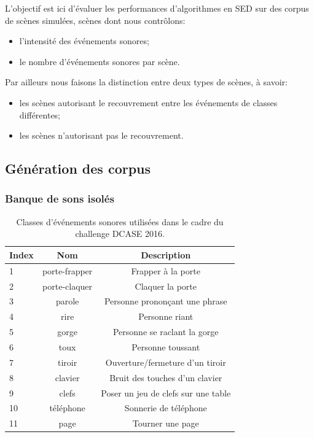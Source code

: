 L'objectif est ici d'évaluer les performances d'algorithmes en SED sur des corpus de scènes simulées, scènes dont nous contrôlons:

\begin{itemize}
\item l'intensité des événements sonores;
\item le nombre d'événements sonores par scène.
\end{itemize}

Par ailleurs nous faisons la distinction entre deux types de scènes, à savoir:

\begin{itemize}
\item les scènes autorisant le recouvrement entre les événements de classes différentes;
\item les scènes n'autorisant pas le recouvrement.
\end{itemize}

\subsection{Génération des corpus}

\subsubsection{Banque de sons isolés}

\begin{table}[t]
\begin{center}
\begin{tabular}{lcc}
\textbf{Index} & \textbf{Nom}  & \textbf{Description}  \\ 
\hline
1   & porte-frapper & Frapper à la porte \\
2   & porte-claquer & Claquer la porte \\
3   & parole        & Personne prononçant une phrase \\
4   & rire          & Personne riant  \\    
5   & gorge         & Personne se raclant la gorge  \\
6   & toux          & Personne toussant \\
7   & tiroir        & Ouverture/fermeture d'un tiroir \\
8   & clavier       & Bruit des touches d'un clavier \\
9   & clefs         & Poser un jeu de clefs sur une table \\    
10  & téléphone     & Sonnerie de téléphone \\
11  & page          & Tourner une page \\     
\hline      
\end{tabular}
\end{center}
\caption{Classes d'événements sonores utilisées dans le cadre du challenge DCASE 2016.}
\label{tab:eventDCASE2016}
\end{table}

